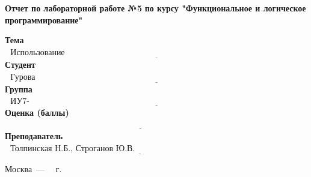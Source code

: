 \begin{titlepage}
	
	\begin{center}
		\Large\textbf{Отчет по лабораторной работе №5}
		\Large\textbf {по курсу "Функциональное и логическое программирование"}
	\end{center}
	
	\noindent\textbf{Тема} $\underline{\text{~~Использование функционалов~~~~~~~~~~~~~~~~~~~~~~~~~~~~~~~~~~~~~~~~~~~~~~~~~~~~~~~~~~~~~~~~~~~~~~~~}}$\newline\newline
	\noindent\textbf{Студент} $\underline{\text{~~Гурова Н.А.~~~~~~~~~~~~~~~~~~~~~~~~~~~~~~~~~~~~~~~~~~~~~~~~~~~~~~~~~~~~~~~~~~~~~~~~~~~~~~~~~~~~~~~~~~~}}$\newline\newline
	\noindent\textbf{Группа} $\underline{\text{~~ИУ7-64Б~~~~~~~~~~~~~~~~~~~~~~~~~~~~~~~~~~~~~~~~~~~~~~~~~~~~~~~~~~~~~~~~~~~~~~~~~~~~~~~~~~~~~~~~~~~~~~~~~}}$\newline\newline
	\noindent\textbf{Оценка (баллы)} $\underline{\text{~~~~~~~~~~~~~~~~~~~~~~~~~~~~~~~~~~~~~~~~~~~~~~~~~~~~~~~~~~~~~~~~~~~~~~~~~~~~~~~~~~~~~~~~~~~~~~~~~}}$\newline\newline
	\noindent\textbf{Преподаватель} $\underline{\text{~~Толпинская Н.Б.,~Строганов Ю.В.~~~~~~~~~~~~~~~~~~~~~~~~~~~~~~~~~~~~~~~~~~~~~~~~~~}}$\newline
	
	\begin{center}
		\vfill
		Москва~---~\the\year
		~г.
	\end{center}
	\restoregeometry
\end{titlepage}

